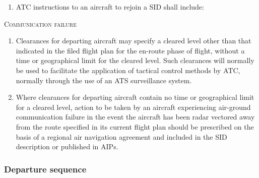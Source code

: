 \documentclass[../main.tex]{subfiles}
\begin{document}
\begin{enumeratesc}
\begin{enumerate}
            \item ATC instructions to an aircraft to rejoin a SID shall include:

            
            
        \end{enumerate}

        \item \textsc{Communication failure}
        \begin{enumerate}
            \item Clearances for departing aircraft may specify a cleared level other than that indicated in the filed flight plan for the en-route phase of flight, without a time or geographical limit for the cleared level. Such clearances will normally be used to facilitate the application of tactical control methods by ATC, normally through the use of an ATS surveillance system.
            \item Where clearances for departing aircraft contain no time or geographical limit for a cleared level, action to be taken by an aircraft experiencing air-ground communication failure in the event the aircraft has been radar vectored away from the route specified in its current flight plan should be prescribed on the basis of a regional air navigation agreement and included in the SID description or published in AIPs.
        \end{enumerate}
    \end{enumeratesc}

    \subsubsection{Departure sequence}
\end{document}
